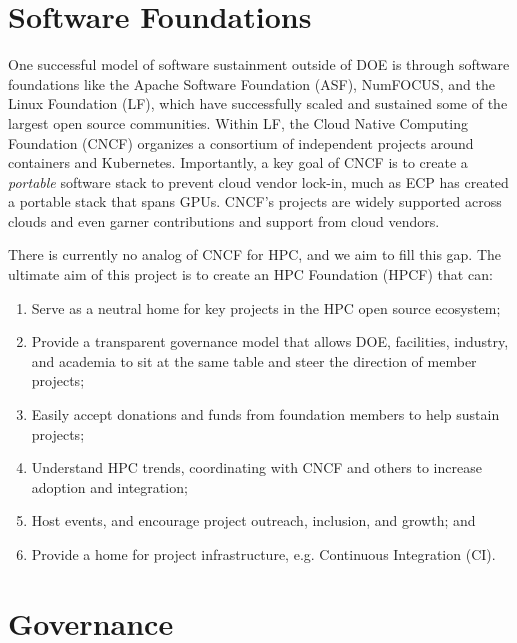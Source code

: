 \documentclass[11pt]{article}
\begin{document}

\section{Software Foundations}

One successful model of software sustainment outside of DOE is through software
foundations like the Apache Software Foundation (ASF), NumFOCUS, and the Linux
Foundation (LF), which have successfully scaled and sustained some of the largest open
source communities. Within LF, the Cloud Native Computing Foundation (CNCF) organizes a
consortium of independent projects around containers and Kubernetes. Importantly, a key
goal of CNCF is to create a {\it portable} software stack to prevent cloud vendor
lock-in, much as ECP has created a portable stack that spans GPUs. CNCF's projects are
widely supported across clouds and even garner contributions and support from cloud
vendors.

There is currently no analog of CNCF for HPC, and we aim to fill this gap. The ultimate
aim of this project is to create an HPC Foundation (HPCF) that can:
\begin{enumerate}
\item Serve as a neutral home for key projects in the HPC open source ecosystem;
\item Provide a transparent governance model that allows DOE, facilities, industry, and
  academia to sit at the same table and steer the direction of member projects;
\item Easily accept donations and funds from foundation members to help sustain projects;
\item Understand HPC trends, coordinating with CNCF and others to increase adoption and
  integration;
\item Host events, and encourage project outreach, inclusion, and growth; and
\item Provide a home for project infrastructure, e.g. Continuous Integration (CI).
\end{enumerate}

\section{Governance}
\end{document}
